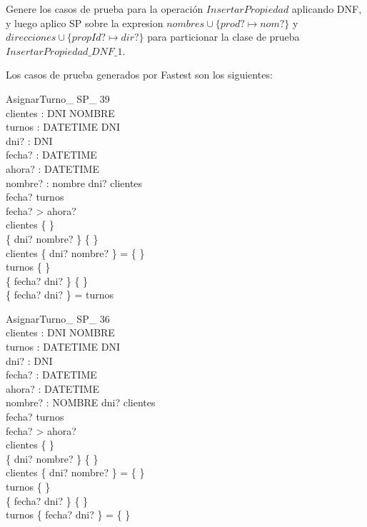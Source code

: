 \documentclass[12pt]{article}
\begin{document}
Genere los casos de prueba para la operación $InsertarPropiedad$ aplicando DNF, y luego aplico SP sobre la expresion $ nombres \cup \{prod? \mapsto nom?\}$ y $direcciones \cup \{propId? \mapsto dir?\}$  para particionar la clase de prueba $InsertarPropiedad\_DNF\_1$.

Los casos de prueba generados por Fastest son los siguientes:

\begin{schema}{AsignarTurno\_ SP\_ 39}\\
clientes : DNI \pfun NOMBRE \\
turnos : DATETIME \pfun DNI \\
dni? : DNI \\
fecha? : DATETIME \\
ahora? : DATETIME \\
nombre? : nombre\where
dni? \notin \dom clientes \\
fecha? \notin \dom turnos \\
fecha? > ahora? \\
clientes \neq \{ \} \\
\{ dni? \mapsto nombre? \} \neq \{ \} \\
clientes \cap \{ dni? \mapsto nombre? \} = \{ \} \\
turnos \neq \{ \} \\
\{ fecha? \mapsto dni? \} \neq \{ \} \\
\{ fecha? \mapsto dni? \} = turnos
\end{schema} 

\begin{schema}{AsignarTurno\_ SP\_ 36}\\
clientes : DNI \pfun NOMBRE \\
turnos : DATETIME \pfun DNI \\
dni? : DNI \\
fecha? : DATETIME \\
ahora? : DATETIME \\
nombre? : NOMBRE
\where
dni? \notin \dom clientes \\
fecha? \notin \dom turnos \\
fecha? > ahora? \\
clientes \neq \{ \} \\
\{ dni? \mapsto nombre? \} \neq \{ \} \\
clientes \cap \{ dni? \mapsto nombre? \} = \{ \} \\
turnos \neq \{ \} \\
\{ fecha? \mapsto dni? \} \neq \{ \} \\
turnos \cap \{ fecha? \mapsto dni? \} = \{ \}
\end{schema}
\end{document}
